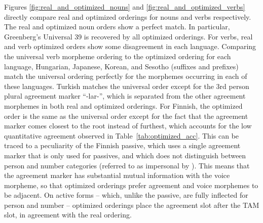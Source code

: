 \documentclass[11pt,letterpaper]{article}
\newcommand{\citep}{\parencite}
\newcommand\becky[1]{{\color{blue}(#1)}}
\begin{document}
Figures \ref{fig:real_and_optimized_nouns} and \ref{fig:real_and_optimized_verbs} directly compare real and optimized orderings for nouns and verbs respectively.
The real and optimized noun orders show a perfect match.
In particular, Greenberg's Universal 39 is recovered by all optimized orderings.
For verbs, real and verb optimized orders show some disagreement in each language.
Comparing the universal verb morpheme ordering to the optimized ordering for each language, Hungarian, Japanese, Korean, and Sesotho (suffixes and prefixes) match the universal ordering perfectly for the morphemes occurring in each of these languages. 
Turkish matches the universal order except for the 3rd person plural agreement marker ``-lar-'', which is separated from the other agreement morphemes in both real and optimized orderings.
For Finnish, the optimized order is the same as the universal order except for the fact that the agreement marker comes closest to the root instead of furthest, which accounts for the low quantitative agreement observed in Table~\ref{tab:optimized_acc}.
This can be traced to a peculiarity of the Finnish passive, which uses a single agreement marker that is only used for passives, and which does not distinguish between person and number categories (referred to as impersonal by \citep[Section 69]{karlsson1999finnish}).
This means that the agreement marker has substantial mutual information with the voice morpheme, so that optimized orderings prefer agreement and voice morphemes to be adjacent.
On active forms -- which, unlike the passive, are fully inflected for person and number -- optimized orderings place the agreement slot after the TAM slot, in agreement with the real ordering.



\end{document}
